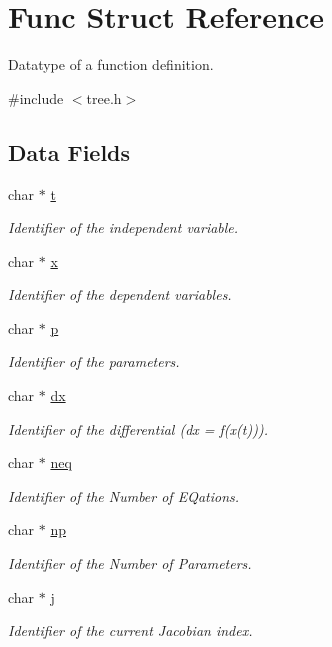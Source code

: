 \hypertarget{structFunc}{\section{Func Struct Reference}
\label{structFunc}
}


Datatype of a function definition.  




{\ttfamily \#include $<$tree.\-h$>$}

\subsection*{Data Fields}
\begin{DoxyCompactItemize}
\item 
char $\ast$ \hyperlink{structFunc_a21feba301403a65090791a94f26c9d92}{t}
\begin{DoxyCompactList}\small\item\em Identifier of the independent variable. \end{DoxyCompactList}\item 
char $\ast$ \hyperlink{structFunc_a87d9da60be62fb1a74b56404c392bf74}{x}
\begin{DoxyCompactList}\small\item\em Identifier of the dependent variables. \end{DoxyCompactList}\item 
char $\ast$ \hyperlink{structFunc_aaa1ebe818ec1c763a776cc580551f3e6}{p}
\begin{DoxyCompactList}\small\item\em Identifier of the parameters. \end{DoxyCompactList}\item 
char $\ast$ \hyperlink{structFunc_aa66668aed9b94cfd43d1d5fcad8e923d}{dx}
\begin{DoxyCompactList}\small\item\em Identifier of the differential (dx = f(x(t))). \end{DoxyCompactList}\item 
char $\ast$ \hyperlink{structFunc_a26607bec2385a751e572c5aa9976262d}{neq}
\begin{DoxyCompactList}\small\item\em Identifier of the Number of E\-Qations. \end{DoxyCompactList}\item 
char $\ast$ \hyperlink{structFunc_ac5e9e8f42513fbf549dcde4107b633d0}{np}
\begin{DoxyCompactList}\small\item\em Identifier of the Number of Parameters. \end{DoxyCompactList}\item 
char $\ast$ \hyperlink{structFunc_aabe3f0c55a8ab8de92abb1da25c055db}{j}
\begin{DoxyCompactList}\small\item\em Identifier of the current Jacobian index. \end{DoxyCompactList}\end{DoxyCompactItemize}


